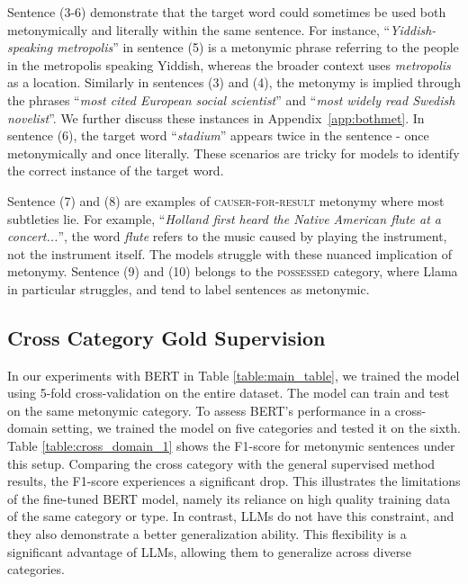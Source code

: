 \documentclass[11pt]{article}
\begin{document}
Sentence (3-6) demonstrate that the target word could sometimes be used both metonymically and literally within the same sentence. For instance, ``\textit{Yiddish-speaking metropolis}'' in sentence (5) is a metonymic phrase referring to the people in the metropolis speaking Yiddish, whereas the broader context uses \textit{metropolis} as a location. Similarly in sentences (3) and (4), the metonymy is implied through the phrases ``\textit{most cited European social scientist}'' and ``\textit{most widely read Swedish novelist}''. We further discuss these instances in  Appendix~\ref{app:bothmet}. In sentence (6), the target word ``\textit{stadium}'' appears twice in the sentence - once metonymically and once literally. These scenarios are tricky for models to identify the correct instance of the target word. 

Sentence (7) and (8) are examples of \textsc{causer-for-result} metonymy where most subtleties lie. For example, ``\textit{Holland first heard the Native American flute at a concert...}'', the word \textit{flute} refers to the music caused by playing the instrument, not the instrument itself. The models struggle with these nuanced implication of metonymy. Sentence (9) and (10) belongs to the \textsc{possessed} category, where Llama in particular struggles, and tend to label sentences as metonymic.

\subsection{Cross Category Gold Supervision}

In our experiments with BERT in Table \ref{table:main_table}, we trained the model using 5-fold cross-validation on the entire dataset. The model can train and test on the same metonymic category. To assess BERT's performance in a cross-domain setting, we trained the model on five categories and tested it on the sixth. Table \ref{table:cross_domain_1} shows the F1-score for metonymic sentences under this setup. Comparing the cross category with the general supervised method results, the F1-score experiences a significant drop. This illustrates the limitations of the fine-tuned BERT model, namely its reliance on high quality training data of the same category or type. In contrast, LLMs do not have this constraint, and they also demonstrate a better generalization ability. This flexibility is a significant advantage of LLMs, allowing them to generalize across diverse categories.
\end{document}
